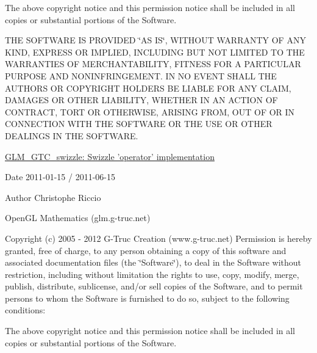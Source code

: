 \-The above copyright notice and this permission notice shall be included in all copies or substantial portions of the \-Software.

\-T\-H\-E \-S\-O\-F\-T\-W\-A\-R\-E \-I\-S \-P\-R\-O\-V\-I\-D\-E\-D \char`\"{}\-A\-S I\-S\char`\"{}, \-W\-I\-T\-H\-O\-U\-T \-W\-A\-R\-R\-A\-N\-T\-Y \-O\-F \-A\-N\-Y \-K\-I\-N\-D, \-E\-X\-P\-R\-E\-S\-S \-O\-R \-I\-M\-P\-L\-I\-E\-D, \-I\-N\-C\-L\-U\-D\-I\-N\-G \-B\-U\-T \-N\-O\-T \-L\-I\-M\-I\-T\-E\-D \-T\-O \-T\-H\-E \-W\-A\-R\-R\-A\-N\-T\-I\-E\-S \-O\-F \-M\-E\-R\-C\-H\-A\-N\-T\-A\-B\-I\-L\-I\-T\-Y, \-F\-I\-T\-N\-E\-S\-S \-F\-O\-R \-A \-P\-A\-R\-T\-I\-C\-U\-L\-A\-R \-P\-U\-R\-P\-O\-S\-E \-A\-N\-D \-N\-O\-N\-I\-N\-F\-R\-I\-N\-G\-E\-M\-E\-N\-T. \-I\-N \-N\-O \-E\-V\-E\-N\-T \-S\-H\-A\-L\-L \-T\-H\-E \-A\-U\-T\-H\-O\-R\-S \-O\-R \-C\-O\-P\-Y\-R\-I\-G\-H\-T \-H\-O\-L\-D\-E\-R\-S \-B\-E \-L\-I\-A\-B\-L\-E \-F\-O\-R \-A\-N\-Y \-C\-L\-A\-I\-M, \-D\-A\-M\-A\-G\-E\-S \-O\-R \-O\-T\-H\-E\-R \-L\-I\-A\-B\-I\-L\-I\-T\-Y, \-W\-H\-E\-T\-H\-E\-R \-I\-N \-A\-N \-A\-C\-T\-I\-O\-N \-O\-F \-C\-O\-N\-T\-R\-A\-C\-T, \-T\-O\-R\-T \-O\-R \-O\-T\-H\-E\-R\-W\-I\-S\-E, \-A\-R\-I\-S\-I\-N\-G \-F\-R\-O\-M, \-O\-U\-T \-O\-F \-O\-R \-I\-N \-C\-O\-N\-N\-E\-C\-T\-I\-O\-N \-W\-I\-T\-H \-T\-H\-E \-S\-O\-F\-T\-W\-A\-R\-E \-O\-R \-T\-H\-E \-U\-S\-E \-O\-R \-O\-T\-H\-E\-R \-D\-E\-A\-L\-I\-N\-G\-S \-I\-N \-T\-H\-E \-S\-O\-F\-T\-W\-A\-R\-E.

\hyperlink{group__gtc__swizzle}{\-G\-L\-M\-\_\-\-G\-T\-C\-\_\-swizzle\-: \-Swizzle 'operator' implementation}

\begin{DoxyDate}{\-Date}
2011-\/01-\/15 / 2011-\/06-\/15 
\end{DoxyDate}
\begin{DoxyAuthor}{\-Author}
\-Christophe \-Riccio
\end{DoxyAuthor}
\-Open\-G\-L \-Mathematics (glm.\-g-\/truc.\-net)

\-Copyright (c) 2005 -\/ 2012 \-G-\/\-Truc \-Creation (www.\-g-\/truc.\-net) \-Permission is hereby granted, free of charge, to any person obtaining a copy of this software and associated documentation files (the \char`\"{}\-Software\char`\"{}), to deal in the \-Software without restriction, including without limitation the rights to use, copy, modify, merge, publish, distribute, sublicense, and/or sell copies of the \-Software, and to permit persons to whom the \-Software is furnished to do so, subject to the following conditions\-:

\-The above copyright notice and this permission notice shall be included in all copies or substantial portions of the \-Software.

